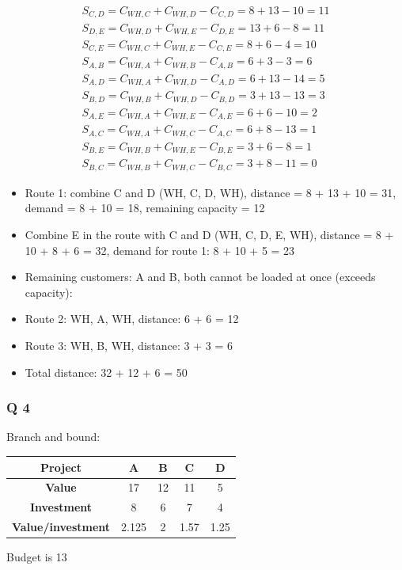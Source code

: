 \documentclass[10pt]{article}
\begin{document}
\begin{gather*}
    S_{C, D} = C_{WH, C} + C_{WH, D} - C_{C, D} = 8 + 13 - 10 = 11\\
    S_{D, E} = C_{WH, D} + C_{WH, E} - C_{D, E} = 13 + 6 - 8 = 11\\
    S_{C, E} = C_{WH, C} + C_{WH, E} - C_{C, E} = 8 + 6 - 4 = 10\\
    S_{A, B} = C_{WH, A} + C_{WH, B} - C_{A, B} = 6 + 3 - 3 = 6\\
    S_{A, D} = C_{WH, A} + C_{WH, D} - C_{A, D} = 6 + 13 - 14 = 5\\
    S_{B, D} = C_{WH, B} + C_{WH, D} - C_{B, D} = 3 + 13 - 13 = 3\\
    S_{A, E} = C_{WH, A} + C_{WH, E} - C_{A, E} = 6 + 6 - 10 = 2\\
    S_{A, C} = C_{WH, A} + C_{WH, C} - C_{A, C} = 6 + 8 - 13 = 1\\
    S_{B, E} = C_{WH, B} + C_{WH, E} - C_{B, E} = 3 + 6 - 8 = 1\\
    S_{B, C} = C_{WH, B} + C_{WH, C} - C_{B, C} = 3 + 8 - 11 = 0
\end{gather*}
\begin{itemize}
    \item Route 1: combine C and D (WH, C, D, WH), distance = 8 + 13 + 10 = 31, demand = 8 + 10 = 18, remaining capacity = 12 
    \item Combine E in the route with C and D (WH, C, D, E, WH), distance = 8 + 10 + 8 + 6 = 32, demand for route 1: 8 + 10 + 5 = 23
    \item Remaining customers: A and B, both cannot be loaded at once (exceeds capacity):
    \item Route 2: WH, A, WH, distance: 6 + 6 = 12 
    \item Route 3: WH, B, WH, distance: 3 + 3 = 6
    \item Total distance: 32 + 12 + 6 = 50 
\end{itemize}
\newpage 
\subsubsection{Q 4}
Branch and bound: 
\begin{center}
    \begin{tabular}{|c|c|c|c|c|}
        \hline 
        \textbf{Project} & \textbf{A} & \textbf{B} & \textbf{C} & \textbf{D} \\\hline 
        \textbf{Value} & 17 & 12 & 11 & 5\\\hline 
        \textbf{Investment} & 8 & 6 & 7 & 4\\\hline
        \textbf{Value/investment} & 2.125 & 2 & 1.57 & 1.25\\\hline 
    \end{tabular}
\end{center}
Budget is 13
\end{document}
